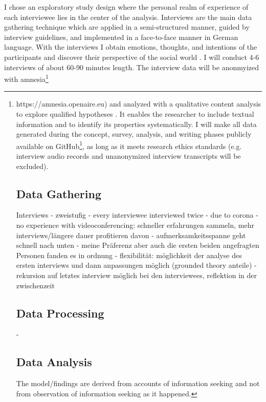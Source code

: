 \documentclass[12pt,a4paper,titlepage,oneside,abstract=true,toc=listof,toc=bibliography]{scrreprt}
\begin{document}
I chose an exploratory study design \citep{Rinsdorf2013} where the personal realm of experience of each interviewee lies in the center of the analysis. Interviews are the main data gathering technique which are applied in a semi-structured manner, guided by interview guidelines, and implemented in a face-to-face manner \citep{Bryman2004} in German language. With the interviews I obtain emotions, thoughts, and intentions of the participants and discover their perspective of the social world \citep{Patton2002}. I will conduct 4-6 interviews of about 60-90 minutes length. The interview data will be anonmyized with amnesia\footnote{https://amnesia.openaire.eu) and analyzed with a qualitative content analysis to explore qualified hypotheses \citep{Kohlbacher2006, Krippendorff2012, Mayring2000, Mayring2014}. It enables the researcher to include textual information and to identify its properties systematically. I will make all data generated during the concept, survey, analysis, and writing phases publicly available on GitHub\footnote{\url{https://github.com/geyslein/Masters_Thesis}}, as long as it meets research ethics standards (e.g. interview audio records and unanonymized interview transcripts will be excluded).

\section{Data Gathering}

Interviews - zweistufig
- every interviewee interviewed twice
- due to corona
- no experience with videoconferencing: schneller erfahrungen sammeln, mehr interviews/längere dauer profitieren davon
- aufmerksamkeitsspanne geht schnell nach unten
- meine Präferenz aber auch die ersten beiden angefragten Personen fanden es in ordnung
- flexibilität: möglichkeit der analyse des ersten interviews und dann anpassungen möglich (grounded theory anteile)
- rekursion auf letztes interview möglich bei den interviewees, reflektion in der zwischenzeit 

\section{Data Processing}
- 

\section{Data Analysis}
The model/findings are derived from accounts of information seeking and not from observation of information seeking as it happened.

}
\end{document}
